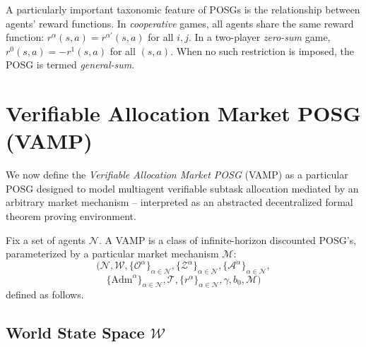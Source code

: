\documentclass[letterpaper]{article} %
\begin{document}

A particularly important taxonomic feature of POSGs is the relationship between agents' reward functions. In \emph{cooperative} games, all agents share the same reward function: $r^\alpha(s,a)=r^{\alpha'}(s,a)$ for all $i,j$. In a two-player \emph{zero-sum} game,
$r^0(s,a)=-r^1(s,a)$ for all $(s,a)$. When no such restriction is imposed, the POSG is termed \emph{general-sum}.



\section{Verifiable Allocation Market POSG (VAMP)}
\label{sec:vamp}

We now define the \emph{Verifiable Allocation Market POSG} (VAMP) as a particular POSG designed to model multiagent verifiable subtask allocation mediated by an arbitrary market mechanism -- interpreted as an abstracted decentralized formal theorem proving environment.

Fix a set of agents $\mathcal{N}$. A VAMP is a class of infinite-horizon discounted POSG's, parameterized by a particular market mechanism $\mathscr{M}$:
\[
\Big(\mathcal{N},\mathcal{W},\{\mathcal{O}^\alpha\}_{\alpha\in\mathcal{N}},\{\mathcal{Z}^\alpha\}_{\alpha\in\mathcal{N}},\{\mathcal{A}^\alpha\}_{\alpha\in\mathcal{N}},
\]\[\{\mathrm{Adm}^\alpha\}_{\alpha\in\mathcal{N}},\mathcal{T},
\{r^\alpha\}_{\alpha\in\mathcal{N}},\gamma,b_0, \mathscr{M}\Big)
\]
defined as follows.

\subsection{World State Space $\mathcal{W}$}
\end{document}
